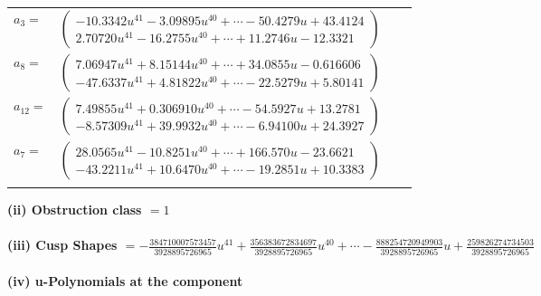 \documentclass[1p]{elsarticle_modified}
\theoremstyle{definition}
\begin{document}
\begin{tabular}{m{7pt} m{180pt} m{7pt} m{180pt} }
\flushright $a_{3}=$&$\begin{pmatrix}-10.3342 u^{41}-3.09895 u^{40}+\cdots-50.4279 u+43.4124\\2.70720 u^{41}-16.2755 u^{40}+\cdots+11.2746 u-12.3321\end{pmatrix}$ \\
\flushright $a_{8}=$&$\begin{pmatrix}7.06947 u^{41}+8.15144 u^{40}+\cdots+34.0855 u-0.616606\\-47.6337 u^{41}+4.81822 u^{40}+\cdots-22.5279 u+5.80141\end{pmatrix}$ \\
\flushright $a_{12}=$&$\begin{pmatrix}7.49855 u^{41}+0.306910 u^{40}+\cdots-54.5927 u+13.2781\\-8.57309 u^{41}+39.9932 u^{40}+\cdots-6.94100 u+24.3927\end{pmatrix}$ \\
\flushright $a_{7}=$&$\begin{pmatrix}28.0565 u^{41}-10.8251 u^{40}+\cdots+166.570 u-23.6621\\-43.2211 u^{41}+10.6470 u^{40}+\cdots-19.2851 u+10.3383\end{pmatrix}$\\&\end{tabular}
\flushleft \textbf{(ii) Obstruction class $= 1$}\\~\\
\flushleft \textbf{(iii) Cusp Shapes $= -\frac{384710007573457}{3928895726965} u^{41}+\frac{356383672834697}{3928895726965} u^{40}+\cdots-\frac{888254720949903}{3928895726965} u+\frac{259826274734503}{3928895726965}$}\\~\\
\newpage\renewcommand{\arraystretch}{1}
\flushleft \textbf{(iv) u-Polynomials at the component}\newline \\
\end{document}
